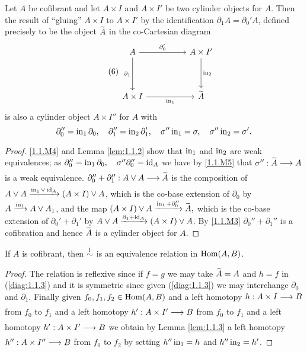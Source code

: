 \documentclass[../main]{subfiles}
\begin{document}
\begin{lemma}\label{lem:1.1.3}
	Let $A$ be cofibrant and let $A\times I$ and $A\times I'$ be two cylinder objects for $A$. Then the result of ``gluing'' $A\times I$ to $A\times I'$ by the identification $\partial_1A=\partial_0'A$, defined precisely to be the object $\xtilde{A}$ in the co-Cartesian diagram
    \[\tag{6}\label{diag:1.1.6}\begin{tikzcd}
	A && {A\times I'} \\
	\\
	{A\times I} && {\xtilde{A}}
	\arrow["{\partial_1}"', from=1-1, to=3-1]
	\arrow["{\partial_0'}", from=1-1, to=1-3]
	\arrow["{\In_1}"', from=3-1, to=3-3]
	\arrow["{\In_2}", from=1-3, to=3-3]
    \end{tikzcd}\]
	is also a cylinder object $A\times I''$ for $A$ with \[\partial_0''=\operatorname{in}_1\partial_0, \quad \partial_1''=\operatorname{in}_2\partial_1', \quad \sigma'' \operatorname{in}_1 = \sigma,\quad \sigma''\operatorname{in}_2=\sigma'.\]
\end{lemma}

\begin{proof}
	\ref{1.1.M4} and Lemma \ref{lem:1.1.2} show that $\operatorname{in}_1$ and $\operatorname{in}_2$ are weak equivalences; as $\partial_0''=\operatorname{in}_1\partial_0,\quad \sigma''\partial_0''=\operatorname{id}_A$ we have by \ref{1.1.M5} that $\sigma'':\xtilde{A}\varrightarrow{}A$ is a weak equivalence. $\partial_0''+\partial_1'':A\vee A\varrightarrow{}\xtilde{A}$ is the composition of $A\vee A\varrightarrow{\In_1\vee \id_A}(A\times I)\vee A$, which is the co-base extension of $\partial_0$ by $A\varrightarrow{\In_1}A\vee A_1$, and the map $(A\times I)\vee A\varrightarrow{\In_1+\partial_0''} \xtilde{A},$ which is the co-base extension of $\partial_0'+\partial_1'$ by $A\vee A\varrightarrow{\partial_1+\id_A}(A\times I)\vee A$. By \ref{1.1.M3} $\partial_0''+\partial_1''$ is a cofibration and hence $\xtilde{A}$ is a cylinder object for $A$.
\end{proof}

\begin{lemma}\label{lem:1.1.4}
	If $A$ is cofibrant, then $\overset{l}{\sim}$ is an equivalence relation in $\operatorname{Hom}(A,B)$.
\end{lemma}

\begin{proof}
	The relation is reflexive since if $f=g$ we may take $\xtilde{A}=A$ and $h=f$ in (\ref{diag:1.1.3}) and it is symmetric since given (\ref{diag:1.1.3}) we may interchange $\partial_0$ and $\partial_1$. Finally given $f_0,f_1,f_2\in \operatorname{Hom}(A,B)$ and a left homotopy $h:A\times I\varrightarrow{} B$ from $f_0$ to $f_1$ and a left homotopy $h':A\times I'\varrightarrow{}B$ from $f_0$ to $f_1$ and a left homotopy $h':A\times I'\varrightarrow{}B$ we obtain by Lemma \ref{lem:1.1.3} a left homotopy $h'':A\times I''\varrightarrow{} B$ from $f_0$ to $f_2$ by setting $h''\operatorname{in}_1=h$ and $h''\operatorname{in}_2 = h'$.
\end{proof}
\end{document}
